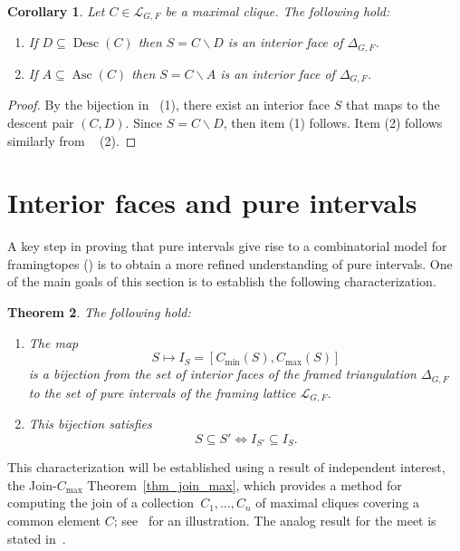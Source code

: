 \documentclass[12pt, reqno]{amsart}
\newcommand{\Asc}{\operatorname{Asc}}
\newcommand{\Desc}{\operatorname{Desc}}
\theoremstyle{plain}
\newtheorem{theorem}{Theorem}[section]
\newtheorem{corollary}[theorem]{Corollary}
\theoremstyle{definition}
\numberwithin{equation}{section}
\newcommand\scrL{\mathscr{L}}
\begin{document}
\begin{corollary}\label{cor_interior_faces_as_clique_minus_ascents}
    Let $C\in \scrL_{G,F}$ be a maximal clique. The following hold:
    \begin{enumerate}
        \item If $D\subseteq \Desc(C)$ then $S=C\smallsetminus D$ is an interior face of $\Delta_{G,F}$.
        \item If $A\subseteq \Asc(C)$ then $S=C\smallsetminus A$ is an interior face of $\Delta_{G,F}$.
    \end{enumerate}
\end{corollary}
\begin{proof}
    By the bijection in~ (1), there exist an interior face $S$ that maps to the descent pair $(C,D)$. Since $S=C\smallsetminus D$, then item (1) follows. Item (2) follows similarly from ~ (2).
\end{proof}
\section{Interior faces and pure intervals}\label{sec_interior_faces_pure_intervals}

A key step in proving that pure intervals give rise to a combinatorial model for framingtopes () is to obtain a more refined understanding of pure intervals. One of the main goals of this section is to establish the following characterization.

\begin{theorem}\label{thm_pure_min_max}
The following hold:
\begin{enumerate}
    \item The map
\[
S \longmapsto I_S=[C_{\min}(S), C_{\max}(S)]
\]
is a bijection from the set of interior faces of the framed triangulation $\Delta_{G,F}$ to the set of pure intervals of the framing lattice $\mathscr{L}_{G,F}$.
\item This bijection satisfies
\[
S\subseteq S' \Leftrightarrow I_{S'}\subseteq I_S.
\]
\end{enumerate}

\end{theorem}

This characterization will be established using a result of independent interest, the Join-$C_{\max}$ Theorem~\ref{thm_join_max}, which provides a method for computing the join of a collection~$C_1,\dots,C_n$ of maximal cliques covering a common element $C$; see~ for an illustration. The analog result for the meet is stated in~.
\end{document}

